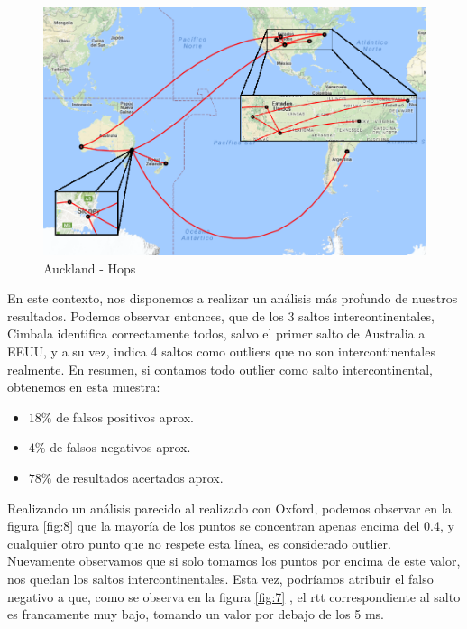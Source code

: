 \newpage

\begin{figure}[!htbp]
  \centering
    \includegraphics[scale=0.6]{imagenes/auckland-graficos/mapa-auckland.png}
  \caption{Auckland - Hops}
  \label{mapa-auckland}
\end{figure}

En este contexto, nos disponemos a realizar un análisis más profundo de nuestros resultados. Podemos observar entonces, que de los 3 saltos intercontinentales, Cimbala identifica correctamente todos, salvo el primer salto de Australia a EEUU, y a su vez, indica 4 saltos como outliers que no son intercontinentales realmente. En resumen, si contamos todo outlier como salto intercontinental, obtenemos en esta muestra:

\begin{itemize}
	\item $18 \% $ de falsos positivos aprox.
	\item $4 \%$ de falsos negativos aprox.
	\item $78 \%$ de resultados acertados aprox.
\end{itemize}

Realizando un análisis parecido al realizado con Oxford, podemos observar en la figura \ref{fig:8} que la mayoría de los puntos se concentran apenas encima del 0.4, y cualquier otro punto que no respete esta línea, es considerado outlier. Nuevamente observamos que si solo tomamos los puntos por encima de este valor, nos quedan los saltos intercontinentales. Esta vez, podríamos atribuir el falso negativo a que, como se observa en la figura \ref{fig:7} , el rtt correspondiente al salto es francamente muy bajo, tomando un valor por debajo de los 5 ms.

